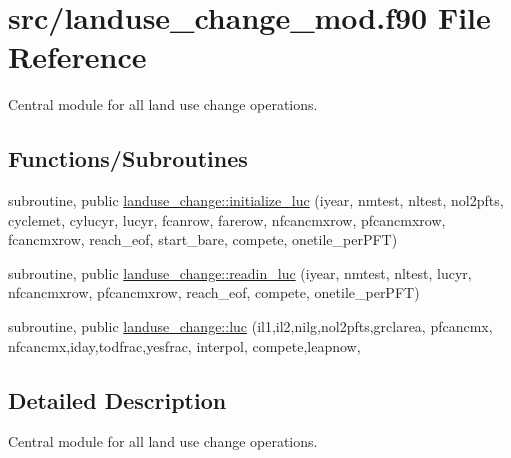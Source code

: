 \hypertarget{landuse__change__mod_8f90}{}\section{src/landuse\+\_\+change\+\_\+mod.f90 File Reference}
\label{landuse__change__mod_8f90}


Central module for all land use change operations.  


\subsection*{Functions/\+Subroutines}
{\bf }\par
\begin{DoxyCompactItemize}
\item 
subroutine, public \hyperlink{group__landuse__change__initialize__luc_gaba5d08f48edbf30aa51b5b4afd03ddfb}{landuse\+\_\+change\+::initialize\+\_\+luc} (iyear, nmtest, nltest, nol2pfts, cyclemet, cylucyr, lucyr, fcanrow, farerow, nfcancmxrow, pfcancmxrow, fcancmxrow, reach\+\_\+eof, start\+\_\+bare, compete, onetile\+\_\+per\+P\+F\+T)
\end{DoxyCompactItemize}

{\bf }\par
\begin{DoxyCompactItemize}
\item 
subroutine, public \hyperlink{group__landuse__change__readin__luc_ga1d8b9a30b4c5c7692e39f3933bc2e13a}{landuse\+\_\+change\+::readin\+\_\+luc} (iyear, nmtest, nltest, lucyr, nfcancmxrow, pfcancmxrow, reach\+\_\+eof, compete, onetile\+\_\+per\+P\+F\+T)
\end{DoxyCompactItemize}

{\bf }\par
\begin{DoxyCompactItemize}
\item 
subroutine, public \hyperlink{group__landuse__change__luc_gaca416d24f2714c7a7de32fb9fb1033db}{landuse\+\_\+change\+::luc} (il1,il2,nilg,nol2pfts,grclarea, pfcancmx, nfcancmx,iday,todfrac,yesfrac, interpol, compete,leapnow,
\end{DoxyCompactItemize}

{\bf }\par

{\bf }\par



\subsection{Detailed Description}
Central module for all land use change operations. 

